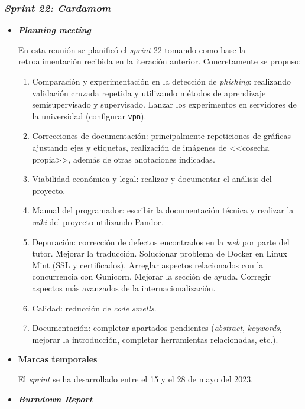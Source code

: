 \subsubsection{\textit{Sprint 22: Cardamom}}
\begin{itemize}
	\item \textbf{\textit{Planning meeting}}
	
	En esta reunión se planificó el \textit{sprint} 22 tomando como base la retroalimentación recibida en la iteración anterior. Concretamente se propuso:
	
	\begin{enumerate}
		\item Comparación y experimentación en la detección de \textit{phishing}: realizando validación cruzada repetida y utilizando métodos de aprendizaje semisupervisado y supervisado. Lanzar los experimentos en servidores de la universidad (configurar \texttt{vpn}).
		\item Correcciones de documentación: principalmente repeticiones de gráficas ajustando ejes y etiquetas, realización de imágenes de <<cosecha propia>>, además de otras anotaciones indicadas.
		\item Viabilidad económica y legal: realizar y documentar el análisis del proyecto.
		\item Manual del programador: escribir la documentación técnica y realizar la \textit{wiki} del proyecto utilizando Pandoc.
		\item Depuración: corrección de defectos encontrados en la \textit{web} por parte del tutor. Mejorar la traducción. Solucionar problema de Docker en Linux Mint (SSL y certificados). Arreglar aspectos relacionados con la concurrencia con Gunicorn. Mejorar la sección de ayuda. Corregir aspectos más avanzados de la internacionalización.
		\item Calidad: reducción de \textit{code smells}.
		\item Documentación: completar apartados pendientes (\textit{abstract}, \textit{keywords}, mejorar la introducción, completar herramientas relacionadas, etc.).
		
		
	\end{enumerate}
	\item \textbf{Marcas temporales}		
	
	El \textit{sprint} se ha desarrollado entre el 15 y el 28 de mayo del 2023.
	
	\item \textbf{\textit{Burndown Report}}
	

\end{itemize}
